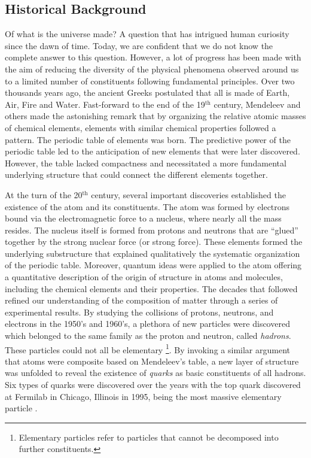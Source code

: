 \subsection*{Historical Background}

Of what is the universe made? A question that has intrigued human curiosity since the dawn of time. 
Today, we are confident that we do not know the complete answer to this question.
However, a lot of progress has been made with the aim of reducing the diversity of the physical phenomena 
observed around us to a limited number of constituents following fundamental principles.
Over two thousands years ago, the ancient Greeks  postulated that all is made of Earth, Air, Fire and Water.
Fast-forward to the end of the 19$^\text{th}$ century, Mendeleev and others made the astonishing remark that by organizing the 
relative atomic masses of chemical elements, elements with similar chemical properties followed a pattern.
The periodic table of elements was born. 
The predictive power of the periodic table led to the anticipation of new elements that were later discovered.
However, the table lacked compactness and necessitated a more fundamental underlying structure that could 
connect the different elements together. 

At the turn of the 20$^\text{th}$ century, several important discoveries established 
the existence of the atom and its constituents. 
The atom was formed by electrons bound via the electromagnetic force to a nucleus, where nearly all the mass resides.
The nucleus itself is formed from 
protons and neutrons that are ``glued'' together by the strong nuclear force (or strong force).
These elements formed the underlying substructure that explained qualitatively the systematic organization of the periodic table.
Moreover, quantum ideas were applied to the atom offering a quantitative description of the origin of structure in atoms and molecules, 
including the chemical elements and their properties.
The decades that followed refined our understanding of the composition of matter through a series of experimental results.
By studying the collisions of protons, neutrons, and electrons in the 1950's and 1960's, a plethora of new particles were discovered 
which belonged to the same family as the proton and neutron, called \textit{hadrons}. %
These particles could not all be elementary
\footnote{Elementary particles refer to  particles that cannot be decomposed into further constituents.}.
By invoking a similar argument that atoms were composite based on Mendeleev's table,
a new layer of structure was unfolded to reveal the existence of \textit{quarks} as basic constituents of all hadrons.
Six types of quarks were discovered over the years with the top quark discovered at Fermilab in Chicago, Illinois 
in 1995, being the most massive elementary particle
\cite{PhysRevLett.74.2626,Abachi:1995iq}.

